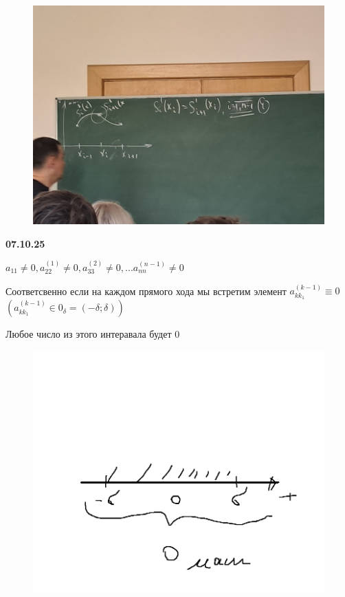 \documentclass{article}
\begin{document}
\begin{figure} [H]
    \includegraphics[width=0.70\linewidth]{photo_5375068150250467857_y.jpg}
\end{figure}


\vspace{20mm}

\textbf{07.10.25}

$a_{11} \neq 0, a_{22}^{(1)} \neq 0, a_{33}^{(2)} \neq 0,... a_{nn}^{(n-1)} \neq 0$

Соответсвенно если на каждом прямого хода мы встретим элемент $a_{kk_1}^{(k-1)} \equiv 0$ 
$(a_{kk_1}^{(k-1)} \in 0_\delta = (-\delta; \delta))$

Любое число из этого интеравала будет 0

\begin{figure} [H]
    \includegraphics[width=0.70\linewidth]{Без имени8.png}
\end{figure}
\end{document}
